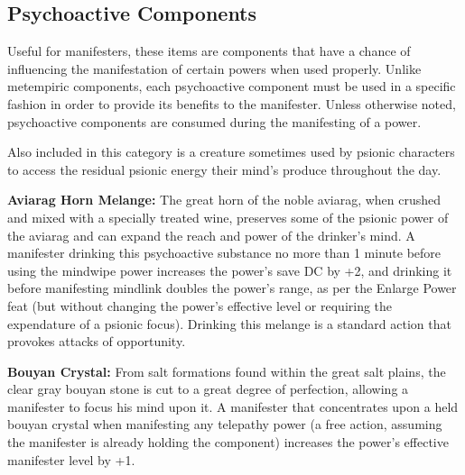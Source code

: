 \subsection{Psychoactive Components}

Useful for manifesters, these items are components that have a chance of influencing the manifestation of certain powers when used properly. Unlike metempiric components, each psychoactive component must be used in a specific fashion in order to provide its benefits to the manifester. Unless otherwise noted, psychoactive components are consumed during the manifesting of a power.

Also included in this category is a creature sometimes used by psionic characters to access the residual psionic energy their mind's produce throughout the day.


\textbf{Aviarag Horn Melange:} The great horn of the noble aviarag, when crushed and mixed with a specially treated wine, preserves some of the psionic power of the aviarag and can expand the reach and power of the drinker's mind. A manifester drinking this psychoactive substance no more than 1 minute before using the mindwipe power increases the power's save DC by +2, and drinking it before manifesting mindlink doubles the power's range, as per the Enlarge Power feat (but without changing the power's effective level or requiring the expendature of a psionic focus). Drinking this melange is a standard action that provokes attacks of opportunity.

\textbf{Bouyan Crystal:} From salt formations found within the great salt plains, the clear gray bouyan stone is cut to a great degree of perfection, allowing a manifester to focus his mind upon it. A manifester that concentrates upon a held bouyan crystal when manifesting any telepathy power (a free action, assuming the manifester is already holding the component) increases the power's effective manifester level by +1.

